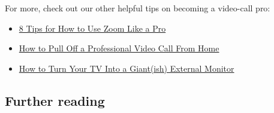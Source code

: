 For more, check out our other helpful tips on becoming a video-call pro:

\begin{itemize}
\tightlist
\item
  \href{https://www.nytimes.com/wirecutter/blog/use-zoom-like-a-pro/}{8
  Tips for How to Use Zoom Like a Pro}
\item
  \href{https://www.nytimes.com/wirecutter/blog/professional-video-call-from-home/}{How
  to Pull Off a Professional Video Call From Home}
\item
  \href{https://www.nytimes.com/wirecutter/blog/turn-tv-into-external-monitor/}{How
  to Turn Your TV Into a Giant(ish) External Monitor}
\end{itemize}

\hypertarget{further-reading}{%
\subsection{Further reading}\label{further-reading}}

